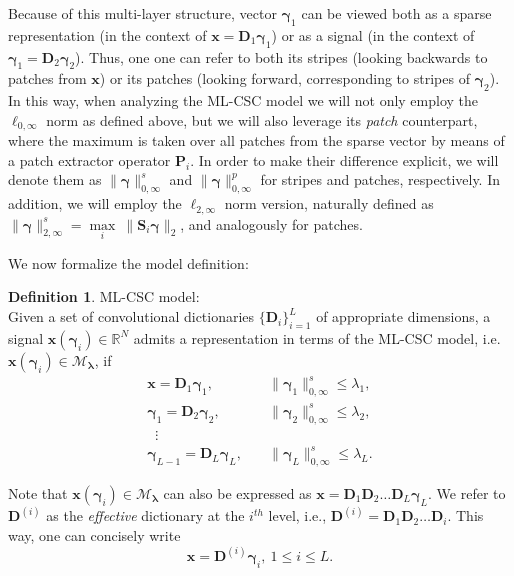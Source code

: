 \documentclass[10pt,journal]{IEEEtran}
\def\x{{\mathbf x}}
\def\D{{\mathbf D}}
\def\M{{\mathcal{M}}}
\def\gama{{\boldsymbol \gamma}}
\def\lamda{{\boldsymbol \lambda}}
\theoremstyle{plain}
\theoremstyle{definition}
\newtheorem{defn}[thm]{Definition} %
\begin{document}
Because of this multi-layer structure, vector $\gama_1$ can be viewed both as a sparse representation (in the context of $\x=\D_1\gama_1$) or as a signal (in the context of $\gama_1 = \D_2\gama_2$). Thus, one one can refer to both its stripes (looking backwards to patches from $\x$) or its patches (looking forward, corresponding to stripes of $\gama_2$). In this way, when analyzing the ML-CSC model we will not only employ the $\ell_{0,\infty}$ norm as defined above, but we will also leverage its \emph{patch} counterpart, where the maximum is taken over all patches from the sparse vector by means of a patch extractor operator $\mathbf{P}_i$. In order to make their difference explicit, we will denote them as $\|\gama\|^s_{0,\infty}$ and $\|\gama\|^p_{0,\infty}$ for stripes and patches, respectively. In addition, we will employ the $\ell_{2,\infty}$ norm version, naturally defined as $\|\gama\|^s_{2,\infty} = \underset{i}{\max}\ \|\mathbf{S}_i\gama \|_2$, and analogously for patches.	

We now formalize the model definition:

\begin{defn}{ML-CSC model:}\\
Given a set of convolutional dictionaries $\{\D_i\}_{i=1}^L$ of appropriate dimensions, a signal $\x(\gama_i) \in \mathbb{R}^{N}$ admits a representation in terms of the ML-CSC model, i.e. $\x(\gama_i) \in \M_{\lamda}$, if
	\begin{align*}
	 \x = \D_1 \gama_1, &  \quad \|\gama_1\|^s_{0,\infty} \leq \lambda_1, \\
	\gama_1 = \D_2 \gama_2, & \quad \|\gama_2\|^s_{0,\infty} \leq \lambda_2 , \\
	\phantom{..} \vdots  \\
	\gama_{L-1} = \D_L \gama_L, & \quad \|\gama_L\|^s_{0,\infty} \leq \lambda_L.
	\end{align*}
\end{defn}

Note that $\x(\gama_i) \in \M_\lamda$ can also be expressed as $\x = \D_1\D_2\dots\D_L \gama_L$. We refer to $\D^{(i)}$ as the \emph{effective} dictionary at the $i^{th}$ level, i.e., $\D^{(i)} = \D_1\D_2\dots\D_i$. This way, one can concisely write
\begin{equation}
	\x = \D^{(i)}\gama_i, \ 1\leq i\leq L.
\end{equation}
\end{document}
